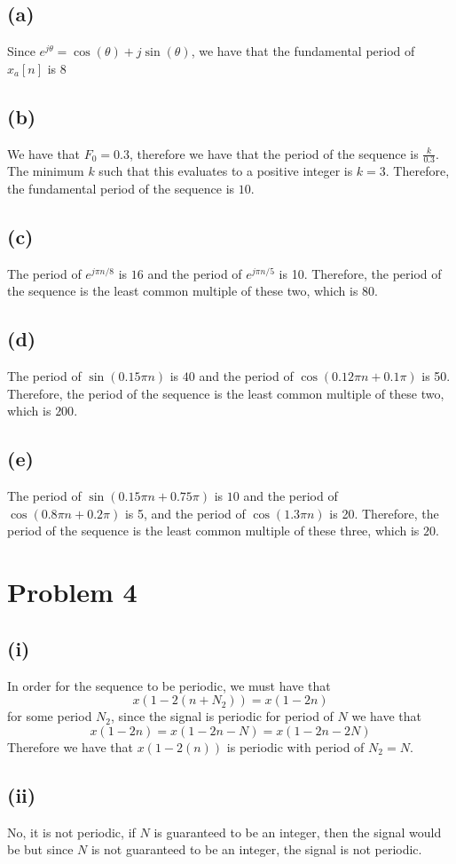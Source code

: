 \subsection*{(a)}
Since $e^{j\theta} = \cos(\theta) + j\sin(\theta)$, we have
that the fundamental period of $\hat{x}_a[n]$ is $\boxed{8}$
\subsection*{(b)}
We have that $F_0=0.3$, therefore we have that the period of the sequence
is $\frac{k}{0.3}$. The minimum $k$ such that this evaluates to a
positive integer is $k=3$. Therefore, the fundamental period of
the sequence is $\boxed{10}$.
\subsection*{(c)}
The period of $e^{j\pi n /8}$ is $16$ and the period of
 $e^{j\pi n /5}$ is 10. Therefore, the period of the sequence
 is the least common multiple of these two, which is $\boxed{80}$. 
\subsection*{(d)}
The period of $\sin(0.15\pi n)$ is $40$ and the period of
 $\cos(0.12\pi n+0.1\pi)$ is 50. Therefore, the period of the sequence
 is the least common multiple of these two, which is $\boxed{200}$. 
\subsection*{(e)}
The period of $\sin(0.15\pi n+0.75\pi)$ is $10$ and the period of
 $\cos(0.8\pi n+0.2\pi)$ is 5, and the period of $\cos(1.3\pi n)$ is 20. Therefore, the period of the sequence
 is the least common multiple of these three, which is $\boxed{20}$.
 \section*{Problem 4}
 \subsection*{(i)}
 In order for the sequence to be periodic, we must have that
 $$x(1-2(n+N_2)) = x(1-2n)$$
 for some period $N_2$, since the signal is periodic for period of 
 $N$ we have that
 $$x(1-2n)=x(1-2n-N)=x(1-2n-2N)$$
 Therefore we have that $x(1-2(n))$ is periodic with period of $N_2=N$.
\subsection*{(ii)}
No, it is not periodic, if $N$ is guaranteed to be an integer, then the signal would be 
but since $N$ is not guaranteed to be an integer, the signal is not periodic.







